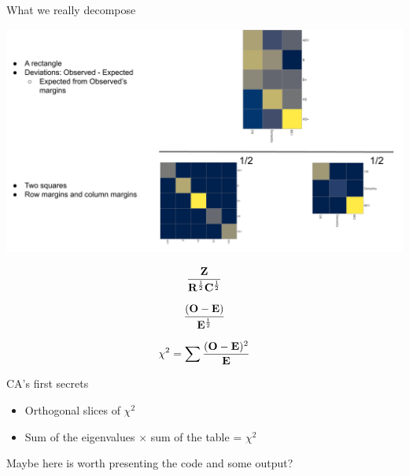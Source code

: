 \documentclass[
  ignorenonframetext,
]{beamer}
\providecommand{\tightlist}{%
  \setlength{\itemsep}{0pt}\setlength{\parskip}{0pt}}
\begin{document}
\begin{frame}{What we really decompose}
\protect\hypertarget{what-we-really-decompose}{}

\includegraphics{../images/Deviations_Over.png}

\end{frame}

\begin{frame}

\[\Huge \frac{\mathbf{Z}}{\mathbf{R}^{\frac{1}{2}}\mathbf{C}^{\frac{1}{2}}}\]

\end{frame}

\begin{frame}

\[\Huge \frac{(\mathbf{O} - \mathbf{E})}{\mathbf{E}^{\frac{1}{2}}}\]

\end{frame}

\begin{frame}

\[\Huge \chi^2 = \sum{\frac{(\mathbf{O} - \mathbf{E})^2}{\mathbf{E}}}\]

\end{frame}

\begin{frame}{CA's first secrets}
\protect\hypertarget{cas-first-secrets}{}

\begin{itemize}[<+->]
\tightlist
\item
  Orthogonal slices of \(\chi^2\)
\item
  Sum of the eigenvalues \(\times\) sum of the table = \(\chi^2\)
\end{itemize}

Maybe here is worth presenting the code and some output?

\end{frame}
\end{document}
